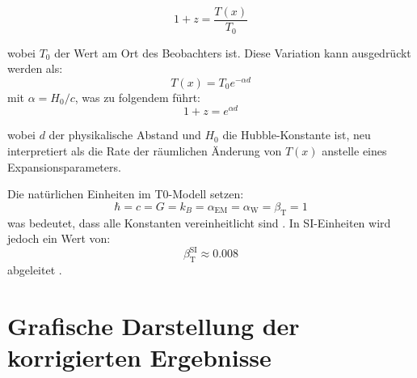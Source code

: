 \documentclass[a4paper,12pt]{article}
\begin{document}
	\begin{equation}
		1 + z = \frac{T(x)}{T_0}
	\end{equation}
	
	wobei \( T_0 \) der Wert am Ort des Beobachters ist. Diese Variation kann ausgedrückt werden als:
	\begin{equation}
		T(x) = T_0 e^{-\alpha d}
	\end{equation}
	mit \( \alpha = H_0 / c \), was zu folgendem führt:
	\begin{equation}
		1 + z = e^{\alpha d}
	\end{equation}
	
	wobei \( d \) der physikalische Abstand und \( H_0 \) die Hubble-Konstante ist, neu interpretiert als die Rate der räumlichen Änderung von \( T(x) \) anstelle eines Expansionsparameters.
	
	Die natürlichen Einheiten im T0-Modell setzen:
	\[
	\hbar = c = G = k_B = \alpha_{\text{EM}} = \alpha_{\text{W}} = \beta_{\text{T}} = 1
	\]
	was bedeutet, dass alle Konstanten vereinheitlicht sind \cite{Pascher2025c}. In SI-Einheiten wird jedoch ein Wert von:
	\[
	\beta_{\text{T}}^{\text{SI}} \approx 0.008
	\]
	abgeleitet \cite{Pascher2025d}.
	
	\section{Grafische Darstellung der korrigierten Ergebnisse}
	
\end{document}
